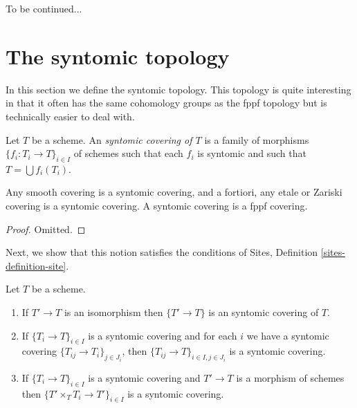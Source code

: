 \noindent
To be continued...

















\section{The syntomic topology}
\label{section-syntomic}

\noindent
In this section we define the syntomic topology.
This topology is quite interesting in that it often
has the same cohomology groups as the fppf topology
but is technically easier to deal with.

\begin{definition}
\label{definition-syntomic-covering}
Let $T$ be a scheme. An {\it syntomic covering of $T$} is a family
of morphisms $\{f_i : T_i \to T\}_{i \in I}$ of schemes
such that each $f_i$ is syntomic and such
that $T = \bigcup f_i(T_i)$.
\end{definition}

\begin{lemma}
\label{lemma-zariski-etale-smooth-syntomic}
Any smooth covering is a syntomic covering, and a fortiori,
any etale or Zariski covering is a syntomic covering.
A syntomic covering is a fppf covering.
\end{lemma}

\begin{proof}
Omitted.
\end{proof}

\noindent
Next, we show that this notion satisfies the conditions of
Sites, Definition \ref{sites-definition-site}.

\begin{lemma}
\label{lemma-syntomic}
Let $T$ be a scheme.
\begin{enumerate}
\item If $T' \to T$ is an isomorphism then $\{T' \to T\}$
is an syntomic covering of $T$.
\item If $\{T_i \to T\}_{i\in I}$ is a syntomic covering and for each
$i$ we have a syntomic covering $\{T_{ij} \to T_i\}_{j\in J_i}$, then
$\{T_{ij} \to T\}_{i \in I, j\in J_i}$ is a syntomic covering.
\item If $\{T_i \to T\}_{i\in I}$ is a syntomic covering
and $T' \to T$ is a morphism of schemes then
$\{T' \times_T T_i \to T'\}_{i\in I}$ is a syntomic covering.
\end{enumerate}
\end{lemma}

